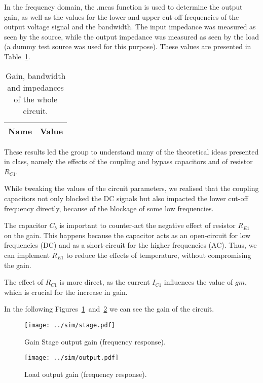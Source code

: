 In the frequency domain, the .meas function is used to determine the output gain, as well as the values for the lower and upper cut-off frequencies of the output voltage signal and the bandwidth. The input impedance was measured as seen by the source, while the output impedance was measured as seen by the load (a dummy test source was used for this purpose). These values are presented in Table~\ref{tab:simdata}.

\begin{table}[h]
  \centering
  \begin{tabular}{|l|r|}
    \hline    
    {\bf Name} & {\bf Value} \\ \hline
	
	  
  \end{tabular}
  \caption{Gain, bandwidth and impedances of the whole circuit.}
  \label{tab:simdata}
\end{table}



These results led the group to understand many of the theoretical ideas presented in class, namely the effects of the coupling and bypass capacitors and of resistor $R_{C1}$.

While tweaking the values of the circuit parameters, we realised that the coupling capacitors not only blocked the DC signals but also impacted the lower cut-off frequency directly, because of the blockage of some low frequencies.

The capacitor $C_b$ is important to counter-act the negative effect of resistor $R_{E1}$ on the gain. This happens because the capacitor acts as an open-circuit for low frequencies (DC) and as a short-circuit for the higher frequencies (AC). Thus, we can implement $R_{E1}$ to reduce the effects of temperature, without compromising the gain.

The effect of $R_{C1}$ is more direct, as the current $I_{C1}$ influences the value of $gm$, which is crucial for the increase in gain.


In the following Figures~\ref{fig:gstage}~and~\ref{fig:out} we can see the gain of the circuit.



\begin{figure}[h] \centering
\texttt{[image: ../sim/stage.pdf]}
	\caption{Gain Stage output gain (frequency response).}
\label{fig:gstage}
\end{figure}



\begin{figure}[h] \centering
\texttt{[image: ../sim/output.pdf]}
	\caption{Load output gain (frequency response).}
\label{fig:out}
\end{figure}



